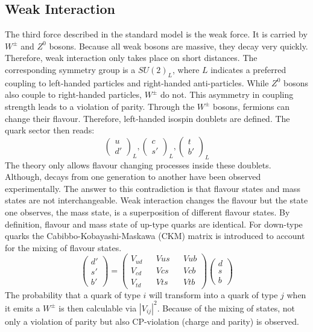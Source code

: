 	\subsection{Weak Interaction}
	The third force described in the standard model is the weak force. It is carried by $W^\pm$ and $Z^0$ bosons. Because all weak bosons are massive, they decay very quickly. Therefore, weak interaction only takes place on short distances. The corresponding symmetry group is a $SU(2)_L$, where $L$ indicates a preferred coupling to left-handed particles and right-handed anti-particles. While $Z^0$ bosons also couple to right-handed particles, $W^\pm$ do not. This asymmetry in coupling strength leads to a violation of parity. Through the $W^\pm$ bosons, fermions can change their flavour. Therefore, left-handed isospin doublets are defined. The quark sector then reads:
	\begin{equation}
	\begin{pmatrix}	u \\ d'	\end{pmatrix}_L,
	\begin{pmatrix}	c \\ s'	\end{pmatrix}_L,
	\begin{pmatrix}	t \\ b'	\end{pmatrix}_L
	\end{equation}
	The theory only allows flavour changing processes inside these doublets. Although, decays from one generation to another have been observed experimentally. The answer to this contradiction is that flavour states and mass states are not interchangeable. Weak interaction changes the flavour but the state one observes, the mass state, is a superposition of different flavour states. By definition, flavour and mass state of up-type quarks are identical. For down-type quarks the Cabibbo-Kobayashi-Maskawa (CKM) matrix is introduced to account for the mixing of flavour states.
	\begin{equation}
	\begin{pmatrix}d'\\s'\\b'\end{pmatrix} = 
	\begin{pmatrix}
	V_{ud}&&V{us}&&V{ub} \\
	V_{cd}&&V{cs}&&V{cb} \\
	V_{td}&&V{ts}&&V{tb}
	\end{pmatrix}
	\begin{pmatrix}d\\s\\b\end{pmatrix}
	\end{equation}
	The probability that a quark of type $i$ will transform into a quark of type $j$ when it emits a $W^\pm$ is then calculable via $|V_{ij}|^2$. Because of the mixing of states, not only a violation of parity but also CP-violation (charge and parity) is observed.

